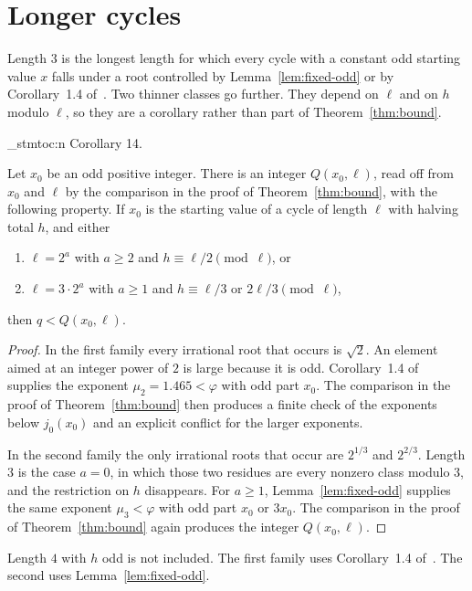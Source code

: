 \documentclass[11pt]{article}
\newenvironment{named}[1]{%
  \par\addvspace{\medskipamount}%
  \pagebreak[3]%
  \noindent{\bfseries #1}\space\ignorespaces
  \stmtoc{#1}%
}{\par\addvspace{\medskipamount}}
\newcommand{\stmtoc}[1]{ \qn_stmtoc:n {#1} }
\newcounter{lemmaref}
\newcommand{\marklemma}[2]{%
  \setcounter{lemmaref}{#1}%
  \addtocounter{lemmaref}{-1}%
  \refstepcounter{lemmaref}%
  \label{#2}%
}
\begin{document}
\section{Longer cycles}
\label{sec:longer}

Length $3$ is the longest length for which every cycle with a constant odd starting value $x$ falls under a root controlled by Lemma~\ref{lem:fixed-odd} or by Corollary~1.4 of~\cite{bauer-bennett-2002}.
Two thinner classes go further.
They depend on $\ell$ and on $h$ modulo $\ell$, so they are a corollary rather than part of Theorem~\ref{thm:bound}.

\begin{named}{Corollary 14.}
\marklemma{14}{cor:longer}
Let $x_0$ be an odd positive integer.
There is an integer $Q(x_0, \ell)$, read off from $x_0$ and $\ell$ by the comparison in the proof of Theorem~\ref{thm:bound}, with the following property.
If $x_0$ is the starting value of a cycle of length $\ell$ with halving total $h$, and either
\begin{enumerate}
\item $\ell = 2^a$ with $a \ge 2$ and $h \equiv \ell/2 \pmod{\ell}$, or
\item $\ell = 3 \cdot 2^a$ with $a \ge 1$ and $h \equiv \ell/3$ or $2\ell/3 \pmod{\ell}$,
\end{enumerate}
then $q < Q(x_0, \ell)$.
\end{named}

\begin{proof}
In the first family every irrational root that occurs is $\sqrt{2}$.
An element aimed at an integer power of $2$ is large because it is odd.
Corollary~1.4 of~\cite{bauer-bennett-2002} supplies the exponent $\mu_2 = 1.465 < \varphi$ with odd part $x_0$.
The comparison in the proof of Theorem~\ref{thm:bound} then produces a finite check of the exponents below $j_0(x_0)$ and an explicit conflict for the larger exponents.

In the second family the only irrational roots that occur are $2^{1/3}$ and $2^{2/3}$.
Length $3$ is the case $a = 0$, in which those two residues are every nonzero class modulo $3$, and the restriction on $h$ disappears.
For $a \ge 1$, Lemma~\ref{lem:fixed-odd} supplies the same exponent $\mu_3 < \varphi$ with odd part $x_0$ or $3x_0$.
The comparison in the proof of Theorem~\ref{thm:bound} again produces the integer $Q(x_0, \ell)$.
\end{proof}

Length $4$ with $h$ odd is not included.
The first family uses Corollary~1.4 of~\cite{bauer-bennett-2002}.
The second uses Lemma~\ref{lem:fixed-odd}.
\end{document}

